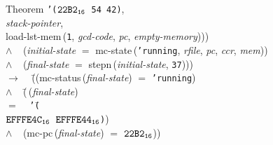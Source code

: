 \begin{tabbing}{\sc Theorem}
{\tt{'}}{\tt{(}}${\tt{22B2}_{16}}${\tt{ }}{\tt{54}}{\tt{ }}{\tt{42}}{\tt{)}}, \\ 
{\it{stack-pointer\/}}, \\ 
{\rm{load-lst-mem}}\,({\tt{1}}, {\it{gcd-code\/}}, {\it{pc\/}}, {\it{empty-memory\/}}))\-) \\ 
$\wedge$$\;\;\;\;$({\it{initial-state\/}} $=$ {\rm{mc-state}}\,({\tt{'}}{\tt{running}}, {\it{rfile\/}}, {\it{pc\/}}, {\it{ccr\/}}, {\it{mem\/}})) \\ 
$\wedge$$\;\;\;\;$({\it{final-state\/}} $=$ {\rm{stepn}}\,({\it{initial-state\/}}, {\tt{37}})))\- \\ 
$\rightarrow$$\;\;\;\;$(\=\+({\rm{mc-status}}\,({\it{final-state\/}}) $=$ {\tt{'}}{\tt{running}}) \\ 
$\wedge$$\;\;\;\;$(\=\,({\it{final-state\/}}) \\ 
$=$$\;\;\;\;${\tt{'}}{\tt{(}}\= \\ 
${\tt{EFFFE4C}_{16}}${\tt{ }}${\tt{EFFFE44}_{16}}${\tt{)}}\-)\- \\ 
$\wedge$$\;\;\;\;$({\rm{mc-pc}}\,({\it{final-state\/}}) $=$ ${\tt{22B2}_{16}}$))\-\-
\end{tabbing}

